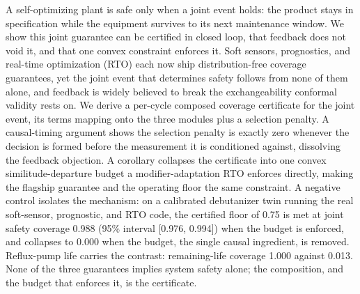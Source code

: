 A self-optimizing plant is safe only when a joint event holds: the product stays in
specification while the equipment survives to its next maintenance window. We show this joint
guarantee can be certified in closed loop, that feedback does not void it, and that one convex
constraint enforces it. Soft sensors, prognostics, and real-time
optimization (RTO) each now ship distribution-free coverage guarantees, yet the joint event that
determines safety follows from none of them alone, and feedback is widely believed to break the
exchangeability conformal validity rests on. We derive a per-cycle composed coverage certificate
for the joint event, its terms mapping onto the three modules plus a selection penalty. A
causal-timing argument shows the selection penalty is exactly zero whenever the decision is formed
before the measurement it is conditioned against, dissolving the feedback objection. A corollary
collapses the certificate into one convex similitude-departure budget a modifier-adaptation RTO
enforces directly, making the flagship guarantee and the operating floor the same constraint. A
negative control isolates the mechanism: on a calibrated debutanizer twin running the real
soft-sensor, prognostic, and RTO code, the certified floor of 0.75 is met at joint safety coverage
0.988 (95\% interval [0.976, 0.994]) when the budget is enforced, and collapses to 0.000 when the
budget, the single causal ingredient, is removed. Reflux-pump life carries the contrast:
remaining-life coverage 1.000 against 0.013. None of the three guarantees implies system safety
alone; the composition, and the budget that enforces it, is the certificate.
